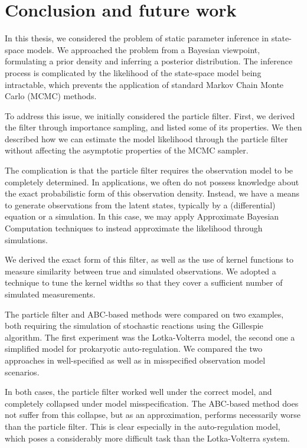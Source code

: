\chapter{Conclusion and future work}
\label{chap:conclusion}

In this thesis, we considered the problem of static parameter inference in state-space models. We approached the problem from a Bayesian viewpoint, formulating a prior density and inferring a posterior distribution. The inference process is complicated by the likelihood of the state-space model being intractable, which prevents the application of standard Markov Chain Monte Carlo (MCMC) methods.

To address this issue, we initially considered the particle filter. First, we derived the filter through importance sampling, and listed some of its properties. We then described how we can estimate the model likelihood through the particle filter without affecting the asymptotic properties of the MCMC sampler.

The complication is that the particle filter requires the observation model to be completely determined. In applications, we often do not possess knowledge about the exact probabilistic form of this observation density. Instead, we have a means to generate observations from the latent states, typically by a (differential) equation or a simulation. In this case, we may apply Approximate Bayesian Computation techniques to instead approximate the likelihood through simulations.

We derived the exact form of this filter, as well as the use of kernel functions to measure similarity between true and simulated observations. We adopted a technique to tune the kernel widths so that they cover a sufficient number of simulated measurements.

The particle filter and ABC-based methods were compared on two examples, both requiring the simulation of stochastic reactions using the Gillespie algorithm. The first experiment was the Lotka-Volterra model, the second one a simplified model for prokaryotic auto-regulation. We compared the two approaches in well-specified as well as in misspecified observation model scenarios.

In both cases, the particle filter worked well under the correct model, and completely collapsed under model misspecification. The ABC-based method does not suffer from this collapse, but as an approximation, performs necessarily worse than the particle filter. This is clear especially in the auto-regulation model, which poses a considerably more difficult task than the Lotka-Volterra system.

